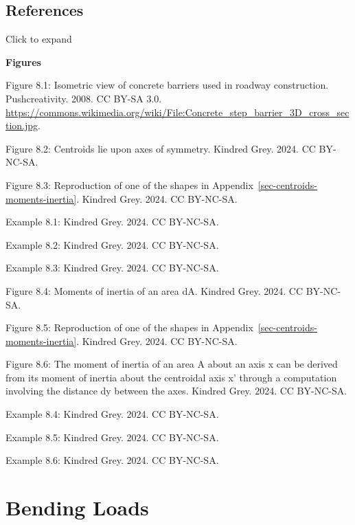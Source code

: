 \documentclass[
  letterpaper,
  DIV=11,
  numbers=noendperiod]{scrreprt}
\theoremstyle{definition}
\theoremstyle{remark}
\begin{document}
\section*{References}\label{references-7}


Click to expand

\textbf{Figures}

Figure 8.1: Isometric view of concrete barriers used in roadway
construction. Pushcreativity. 2008. CC BY-SA 3.0.
\url{https://commons.wikimedia.org/wiki/File:Concrete_step_barrier_3D_cross_section.jpg}.

Figure 8.2: Centroids lie upon axes of symmetry. Kindred Grey. 2024. CC
BY-NC-SA.

Figure 8.3: Reproduction of one of the shapes in
Appendix~\ref{sec-centroids-moments-inertia}. Kindred Grey. 2024. CC
BY-NC-SA.

Example 8.1: Kindred Grey. 2024. CC BY-NC-SA.

Example 8.2: Kindred Grey. 2024. CC BY-NC-SA.

Example 8.3: Kindred Grey. 2024. CC BY-NC-SA.

Figure 8.4: Moments of inertia of an area dA. Kindred Grey. 2024. CC
BY-NC-SA.

Figure 8.5: Reproduction of one of the shapes in
Appendix~\ref{sec-centroids-moments-inertia}. Kindred Grey. 2024. CC
BY-NC-SA.

Figure 8.6: The moment of inertia of an area A about an axis x can be
derived from its moment of inertia about the centroidal axis x' through
a computation involving the distance dy between the axes. Kindred Grey.
2024. CC BY-NC-SA.

Example 8.4: Kindred Grey. 2024. CC BY-NC-SA.

Example 8.5: Kindred Grey. 2024. CC BY-NC-SA.

Example 8.6: Kindred Grey. 2024. CC BY-NC-SA.


\chapter{Bending Loads}\label{sec-bending-loads}
\end{document}
